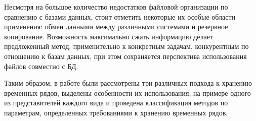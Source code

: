 Несмотря на большое количество недостатков файловой организации по сравнению с базами данных,
стоит отметить некоторые их особые области применения: обмен данными между различными системами и резервное копирование.
Возможность максимально сжать информацию делает предложенный метод, применительно к конкретным задачам,
конкурентным по отношению к базам данных, при этом сохраняется перспектива использования файлов совместно с БД.

Таким образом, в работе были рассмотрены три различных подхода к хранению временных рядов,
выделены особенности их использования, на примере одного из представителей каждого вида и
проведена классификация методов по параметрам, определенных требованиями к хранению временных рядов.

